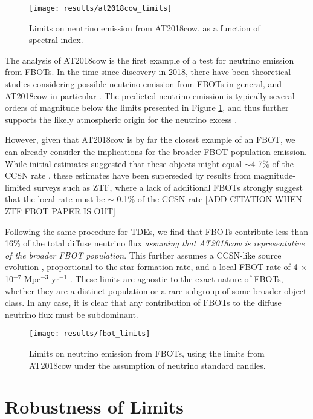 \begin{figure}[!ht]
	\centering \texttt{[image: results/at2018cow\_limits]}
	\caption{Limits on neutrino emission from AT2018cow, as a function of spectral index.}
	\label{fig:at2018cow_limits}
\end{figure}

The analysis of AT2018cow is the first example of a test for neutrino emission from FBOTs. In the time since discovery in 2018, there have been theoretical studies considering possible neutrino emission from FBOTs in general, and AT2018cow in particular . The predicted neutrino emission is typically several orders of magnitude below the limits presented in Figure \ref{fig:at2018cow_limits}, and thus further supports the likely atmospheric origin for the neutrino excess \cite{2018ATel11785....1B}.

However, given that AT2018cow is by far the closest example of an FBOT, we can already consider the implications for the broader FBOT population emission. While initial estimates suggested that these objects might equal $\sim$4-7\% of the CCSN rate \cite{drout_fbot, fang_fbot}, these estimates have been superseded by results from magnitude-limited surveys such as ZTF, where a lack of additional FBOTs strongly suggest that the local rate must be $\sim$ 0.1\% of the CCSN rate [ADD CITATION WHEN ZTF FBOT PAPER IS OUT] 

Following the same procedure for TDEs, we find that FBOTs contribute less than 16\% of the total diffuse neutrino flux \emph{assuming that AT2018cow is representative of the broader FBOT population}. This further assumes a CCSN-like source evolution , proportional to the star formation rate, and a local FBOT rate of 4 $\times$ 10$^{-7}$ Mpc$^{-3}$ yr$^{-1}$ \cite{ho_koala}. These limits are agnostic to the exact nature of FBOTs, whether they are a distinct population or a rare subgroup of some broader object class. In any case, it is clear  that any contribution of FBOTs to the diffuse neutrino flux must be subdominant.

\begin{figure}[!ht]
	\centering \texttt{[image: results/fbot\_limits]}
	\caption{Limits on neutrino emission from FBOTs, using the limits from AT2018cow under the assumption of neutrino standard candles.}
	\label{fig:fbot_limits}
\end{figure}

\section{Robustness of Limits}

